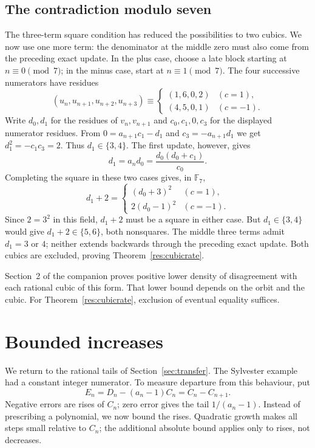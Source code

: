\documentclass[11pt]{article}
\begin{document}
\subsection{The contradiction modulo seven}\label{sec:cubic-mod-seven}
The three-term square condition has reduced the possibilities to two
cubics. We now use one more term: the denominator at the middle zero
must also come from the preceding exact update.
In the plus case, choose a late block starting at $n\equiv0\pmod7$;
in the minus case, start at $n\equiv1\pmod7$. The four successive
numerators have residues
\[
 (u_n,u_{n+1},u_{n+2},u_{n+3})\equiv
 \begin{cases}(1,6,0,2)&(c=1),\\(4,5,0,1)&(c=-1).
 \end{cases}
\]
Write $d_0,d_1$ for the residues of $v_n,v_{n+1}$ and
$c_0,c_1,0,c_3$ for the displayed numerator residues. From
$0=a_{n+1}c_1-d_1$ and $c_3=-a_{n+1}d_1$ we get
$d_1^2=-c_1c_3=2$. Thus $d_1\in\{3,4\}$.
The first update, however, gives
\[
 d_1=a_nd_0=\frac{d_0(d_0+c_1)}{c_0}.
\]
Completing the square in these two cases gives, in $\mathbb F_7$,
\[
 d_1+2=
 \begin{cases}
 (d_0+3)^2 &(c=1),\\
 2(d_0-1)^2 &(c=-1).
 \end{cases}
\]
Since $2=3^2$ in this field, $d_1+2$ must be a square in either case.
But $d_1\in\{3,4\}$ would give $d_1+2\in\{5,6\}$, both nonsquares.
The middle three terms admit $d_1=3$ or $4$; neither extends
backwards through the preceding exact update. Both cubics are excluded,
proving Theorem~\ref{res:cubicrate}.

Section~2 of the companion proves positive lower density of
disagreement with each rational cubic of this form. That lower bound
depends on the orbit and the cubic. For Theorem~\ref{res:cubicrate},
exclusion of eventual equality suffices.
\section{Bounded increases}\label{sec:bounded}
We return to the rational tails of Section~\ref{sec:transfer}.
The Sylvester example had a constant integer numerator. To measure
departure from this behaviour, put
\[
 E_n=D_n-(a_n-1)C_n=C_n-C_{n+1}.
\]
Negative errors are rises of $C_n$; zero error gives the tail
$1/(a_n-1)$. Instead of prescribing a polynomial, we now bound the
rises. Quadratic growth makes all steps small relative to $C_n$;
the additional absolute bound applies only to rises, not decreases.
\end{document}

